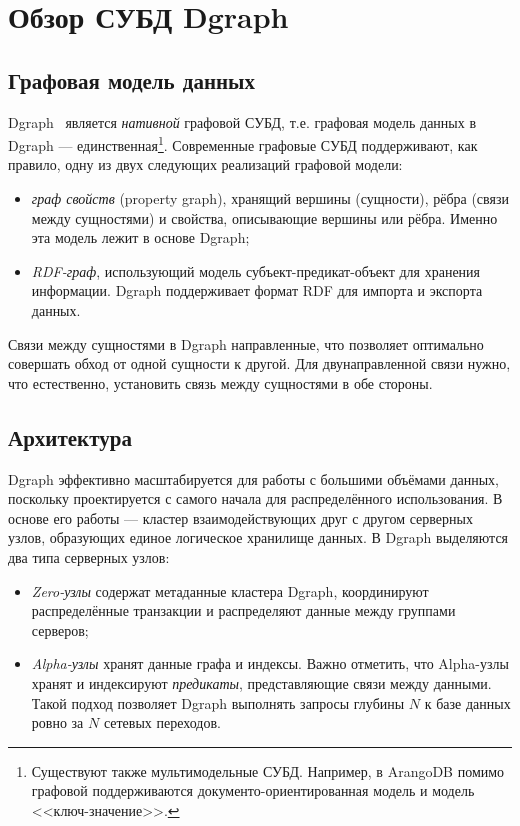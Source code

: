 \section {Обзор СУБД Dgraph}
\subsection{Графовая модель данных}

Dgraph~\cite{dgraph} является \textit{нативной} графовой СУБД, т.е. графовая модель данных в Dgraph
--- единственная\footnote{Существуют также мультимодельные СУБД. Например, в ArangoDB помимо графовой
поддерживаются документо-ориентированная модель и модель <<ключ-значение>>.}. Современные графовые
СУБД поддерживают, как правило, одну из двух следующих реализаций графовой модели:
\begin{itemize}
  \item \textit{граф свойств} (property graph), хранящий вершины (сущности), рёбра (связи между
    сущностями) и свойства, описывающие вершины или рёбра. Именно эта модель лежит в основе Dgraph;
  \item \textit{RDF-граф}, использующий модель субъект-предикат-объект для хранения информации.
    Dgraph поддерживает формат RDF для импорта и экспорта данных.
\end{itemize}

Связи между сущностями в Dgraph направленные, что позволяет оптимально совершать обход от одной
сущности к другой. Для двунаправленной связи нужно, что естественно, установить связь между
сущностями в обе стороны.

\subsection{Архитектура}

Dgraph эффективно масштабируется для работы с большими объёмами данных, поскольку проектируется с
самого начала для распределённого использования. В основе его работы --- кластер взаимодействующих
друг с другом серверных узлов, образующих единое логическое хранилище данных. В Dgraph выделяются
два типа серверных узлов:
\begin{itemize}
  \item \textit{Zero-узлы} содержат метаданные кластера Dgraph, координируют распределённые
    транзакции и распределяют данные между группами серверов;
  \item \textit{Alpha-узлы} хранят данные графа и индексы. Важно отметить, что Alpha-узлы хранят
    и индексируют \textit{предикаты}, представляющие связи между данными. Такой подход позволяет
    Dgraph выполнять запросы глубины $N$ к базе данных ровно за $N$ сетевых переходов.
\end{itemize}

